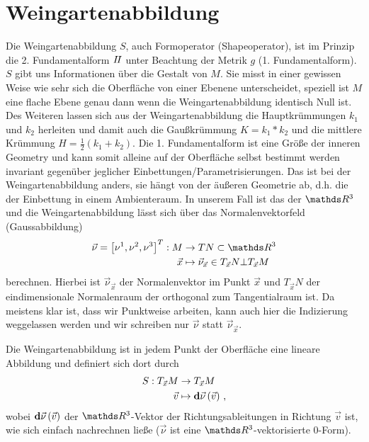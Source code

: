 \section{Weingartenabbildung}
\label{secWeingartenabbildung}
  Die Weingartenabbildung \( S \), auch Formoperator (Shapeoperator), ist im Prinzip die 2. Fundamentalform \( I \! I \) unter Beachtung der Metrik \(
 g \) (1. Fundamentalform).
  \( S \) gibt uns Informationen über die Gestalt von \( M \). 
  Sie misst in einer gewissen Weise wie sehr sich die Oberfläche von einer Ebenene unterscheidet, speziell ist \( M \) eine flache Ebene
  genau dann wenn die Weingartenabbildung identisch Null ist.
  Des Weiteren lassen sich aus der Weingartenabbildung die Hauptkrümmungen \( k_{1} \) und \( k_{2} \) herleiten und damit auch die
  Gaußkrümmung \( K = k_{1}*k_{2} \) und die mittlere Krümmung \( H = \frac{1}{2}\left( k_{1} + k_{2} \right) \).
  Die 1. Fundamentalform ist eine Größe der inneren Geometry und kann somit alleine auf der Oberfläche selbst bestimmt werden
  invariant gegenüber jeglicher Einbettungen/Parametrisierungen.
  Das ist bei der Weingartenabbildung anders, sie hängt von der äußeren Geometrie ab, d.h. die der Einbettung in einem Ambienteraum.
  In unserem Fall ist das der \( \R^{3} \) und die Weingartenabbildung lässt sich über das Normalenvektorfeld (Gaussabbildung)
  \begin{align}
    \vec{\nu} = \left[ \nu^{1}, \nu^{2}, \nu^{3} \right]^{T}: M &\rightarrow TN \subset \R^{3} \\
                         \vec{x} &\mapsto \vec{\nu}_{\vec{x}} \in T_{\vec{x}}N \bot T_{\vec{x}}M
  \end{align}
  berechnen. 
  Hierbei ist \( \vec{\nu}_{\vec{x}} \) der Normalenvektor im Punkt \( \vec{x} \) und \( T_{\vec{x}}N \) der eindimensionale Normalenraum
  der orthogonal zum Tangentialraum ist. 
  Da meistens klar ist, dass wir Punktweise arbeiten, kann auch hier die Indizierung weggelassen werden und wir schreiben nur 
  \( \vec{\nu} \) statt \( \vec{\nu}_{\vec{x}} \).
  \begin{definition}
    Die Weingartenabbildung ist in jedem Punkt der Oberfläche eine lineare Abbildung und definiert sich dort durch
    \begin{align}
      S: T_{\vec{x}}M &\rightarrow T_{\vec{x}}M \\
                    \vec{v} &\mapsto \mathbf{d}\vec{\nu} \left( \vec{v} \right) \,\text{,}
    \end{align}
    wobei \( \mathbf{d}\vec{\nu} \left( \vec{v} \right) \) der \( \R^{3} \)-Vektor der Richtungsableitungen in Richtung \( \vec{v}
    \) ist, wie sich einfach nachrechnen ließe (\( \vec{\nu} \) ist eine \( \R^{3} \)-vektorisierte 0-Form).
  \end{definition}
